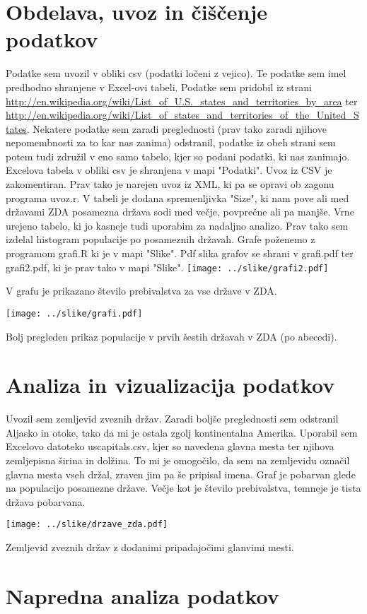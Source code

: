 \documentclass[11pt,a4paper]{article}
\begin{document}
\pagebreak

\section{Obdelava, uvoz in čiščenje podatkov}

Podatke sem uvozil v obliki csv (podatki ločeni z vejico). Te podatke sem imel predhodno shranjene v Excel-ovi tabeli. Podatke sem pridobil iz strani 
\url{http://en.wikipedia.org/wiki/List_of_U.S._states_and_territories_by_area} ter
\url{http://en.wikipedia.org/wiki/List_of_states_and_territories_of_the_United_States}. 
Nekatere podatke sem zaradi preglednosti (prav tako zaradi njihove nepomembnosti za to kar nas zanima) odstranil, podatke iz obeh strani sem potem tudi združil v eno samo tabelo, kjer so podani podatki, ki nas zanimajo. Excelova tabela v obliki csv je shranjena v mapi "Podatki".
Uvoz iz CSV je zakomentiran.
Prav tako je narejen uvoz iz XML, ki pa se opravi ob zagonu programa uvoz.r. V tabeli je dodana spremenljivka "Size", ki nam pove ali med državami ZDA posamezna država sodi med večje, povprečne ali pa manjše. Vrne urejeno tabelo, ki jo kasneje tudi uporabim za nadaljno analizo.
Prav tako sem izdelal histogram populacije po posameznih državah.
Grafe poženemo z programom grafi.R ki je v mapi "Slike". Pdf slika grafov se shrani v 
grafi.pdf ter grafi2.pdf,  ki je prav tako v mapi "Slike".
\vfill
\texttt{[image: ../slike/grafi2.pdf]}

V grafu je prikazano število prebivalstva za vse države v ZDA.


\texttt{[image: ../slike/grafi.pdf]}

Bolj pregleden prikaz populacije v prvih šestih državah v ZDA (po abecedi).

\pagebreak

\section{Analiza in vizualizacija podatkov}

Uvozil sem zemljevid zveznih držav. Zaradi boljše preglednosti sem odstranil Aljasko in otoke, tako da mi je ostala zgolj kontinentalna Amerika. Uporabil sem Excelovo datoteko uscapitals.csv, kjer so navedena glavna mesta ter njihova zemljepisna širina in dolžina. To mi je omogočilo, da sem na zemljevidu označil glavna mesta vseh držal, zraven jim pa še pripisal imena. Graf je pobarvan glede na populacijo posamezne države. Večje kot je število prebivalstva, temneje je tista država pobarvana.

\texttt{[image: ../slike/drzave\_zda.pdf]}

Zemljevid zveznih držav z dodanimi pripadajočimi glanvimi mesti.

\newpage
\section{Napredna analiza podatkov}
\end{document}
